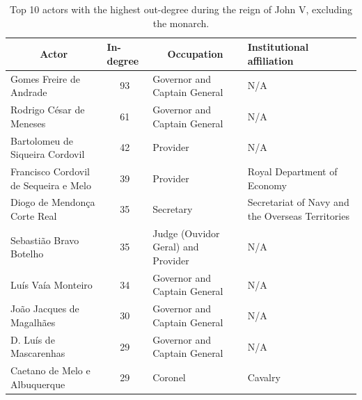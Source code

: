 \documentclass{article}
\begin{document}
\begin{table}[]
	\vspace{0.2cm}
	\centering
	\caption{Top 10 actors with the highest out-degree during the reign of John V, excluding the monarch. \label{tb:out_john}}
	\vspace{0.2cm}
	\begin{tabular}{|p{4cm}|c|p{4cm}|p{4cm}|}
		\hline
		\multicolumn{1}{|c|}{Actor}           & \multicolumn{1}{l|}{In-degree} & \multicolumn{1}{c|}{Occupation}                   & \multicolumn{1}{l|}{Institutional affiliation}   \\ \hline
		Gomes Freire de Andrade               & 93                             & Governor and Captain General                      & N/A                                              \\ \hline
		Rodrigo César de Meneses              & 61                             & Governor and Captain General                      & N/A                                              \\ \hline
		Bartolomeu de Siqueira Cordovil       & 42                             & Provider                                          & N/A                                              \\ \hline
		Francisco Cordovil de Sequeira e Melo & 39                             & Provider                                          & Royal Department of Economy                      \\ \hline
		Diogo de Mendonça Corte Real          & 35                             & Secretary                                         & Secretariat of Navy and the Overseas Territories \\ \hline
		Sebastião Bravo Botelho               & 35                             & Judge (Ouvidor Geral) and Provider                & N/A                                              \\ \hline
		Luís Vaía Monteiro                    & 34                             & Governor and Captain General                      & N/A                                              \\ \hline
		João Jacques de Magalhães             & 30                             & \multicolumn{1}{l|}{Governor and Captain General} & N/A                                              \\ \hline
		D. Luís de Mascarenhas                & 29                             & \multicolumn{1}{l|}{Governor and Captain General} & N/A                                              \\ \hline
		Caetano de Melo e Albuquerque         & 29                             & \multicolumn{1}{l|}{Coronel}                      & Cavalry                                          \\ \hline
	\end{tabular}
\end{table}
\end{document}
